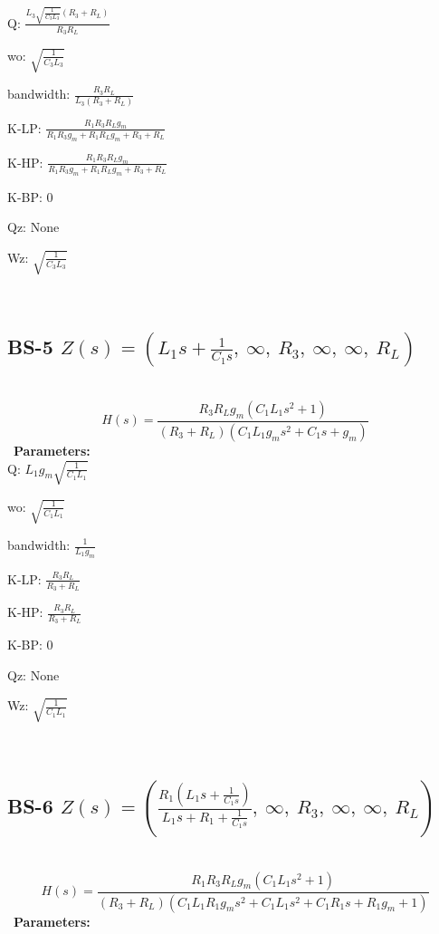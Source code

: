 \documentclass{article}
\begin{document}
Q: $\frac{L_{3} \sqrt{\frac{1}{C_{3} L_{3}}} \left(R_{3} + R_{L}\right)}{R_{3} R_{L}}$\ 

wo: $\sqrt{\frac{1}{C_{3} L_{3}}}$\ 

bandwidth: $\frac{R_{3} R_{L}}{L_{3} \left(R_{3} + R_{L}\right)}$\ 

K-LP: $\frac{R_{1} R_{3} R_{L} g_{m}}{R_{1} R_{3} g_{m} + R_{1} R_{L} g_{m} + R_{3} + R_{L}}$\ 

K-HP: $\frac{R_{1} R_{3} R_{L} g_{m}}{R_{1} R_{3} g_{m} + R_{1} R_{L} g_{m} + R_{3} + R_{L}}$\ 

K-BP: $0$\ 

Qz: $\text{None}$\ 

Wz: $\sqrt{\frac{1}{C_{3} L_{3}}}$\ 

\ 

\subsection{BS-5 $Z(s) = \left( L_{1} s + \frac{1}{C_{1} s}, \  \infty, \  R_{3}, \  \infty, \  \infty, \  R_{L}\right)$ } \ 
\textbf{\[H(s) = \frac{R_{3} R_{L} g_{m} \left(C_{1} L_{1} s^{2} + 1\right)}{\left(R_{3} + R_{L}\right) \left(C_{1} L_{1} g_{m} s^{2} + C_{1} s + g_{m}\right)}\] } \ 
\textbf{Parameters:}\\ 

Q: $L_{1} g_{m} \sqrt{\frac{1}{C_{1} L_{1}}}$\ 

wo: $\sqrt{\frac{1}{C_{1} L_{1}}}$\ 

bandwidth: $\frac{1}{L_{1} g_{m}}$\ 

K-LP: $\frac{R_{3} R_{L}}{R_{3} + R_{L}}$\ 

K-HP: $\frac{R_{3} R_{L}}{R_{3} + R_{L}}$\ 

K-BP: $0$\ 

Qz: $\text{None}$\ 

Wz: $\sqrt{\frac{1}{C_{1} L_{1}}}$\ 

\ 

\subsection{BS-6 $Z(s) = \left( \frac{R_{1} \left(L_{1} s + \frac{1}{C_{1} s}\right)}{L_{1} s + R_{1} + \frac{1}{C_{1} s}}, \  \infty, \  R_{3}, \  \infty, \  \infty, \  R_{L}\right)$ } \ 
\textbf{\[H(s) = \frac{R_{1} R_{3} R_{L} g_{m} \left(C_{1} L_{1} s^{2} + 1\right)}{\left(R_{3} + R_{L}\right) \left(C_{1} L_{1} R_{1} g_{m} s^{2} + C_{1} L_{1} s^{2} + C_{1} R_{1} s + R_{1} g_{m} + 1\right)}\] } \ 
\textbf{Parameters:}\\ 
\end{document}
